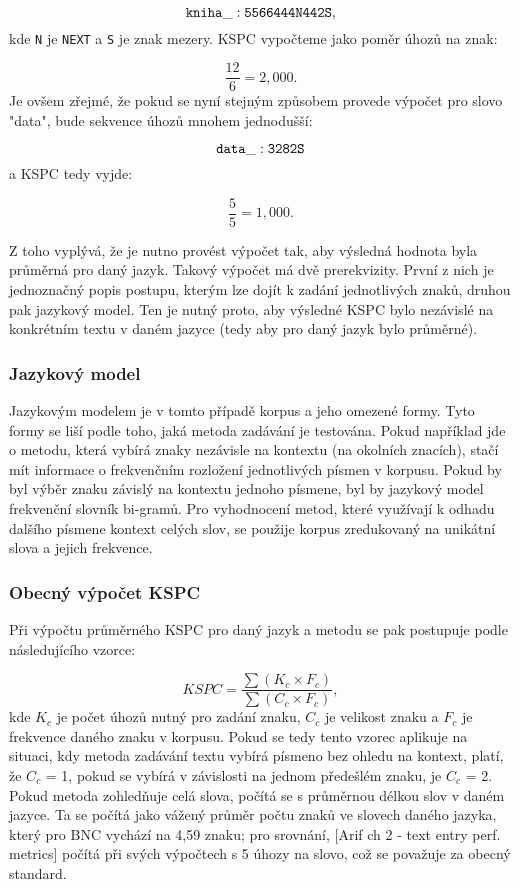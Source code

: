 \documentclass[a4paper,11pt]{article}
\begin{document}
\[
	{\tt kniha\_: 5566444N442S},
\]
kde {\tt N} je {\tt NEXT} a {\tt S} je znak mezery. KSPC vypočteme jako poměr úhozů na znak:

\[
	\frac{12}{6} = 2,000.
\]
Je ovšem zřejmé, že pokud se nyní stejným způsobem provede výpočet pro slovo "data", bude sekvence úhozů mnohem jednodušší:

\[
	{\tt data\_: 3282S}
\]
a KSPC tedy vyjde:

\[
	\frac{5}{5} = 1,000.
\]

Z toho vyplývá, že je nutno provést výpočet tak, aby výsledná hodnota byla průměrná pro daný jazyk. Takový výpočet má dvě prerekvizity. První z nich je jednoznačný popis postupu, kterým lze dojít k zadání jednotlivých znaků, druhou pak jazykový model. Ten je nutný proto, aby výsledné KSPC bylo nezávislé na konkrétním textu v daném jazyce (tedy aby pro daný jazyk bylo průměrné).

\subsubsection{Jazykový model}

Jazykovým modelem je v tomto případě korpus a jeho omezené formy. Tyto formy se liší podle toho, jaká metoda zadávání je testována. Pokud například jde o metodu, která vybírá znaky nezávisle na kontextu (na okolních znacích), stačí mít informace o frekvenčním rozložení jednotlivých písmen v korpusu. Pokud by byl výběr znaku závislý na kontextu jednoho písmene, byl by jazykový model frekvenční slovník bi-gramů. Pro vyhodnocení metod, které využívají k odhadu dalšího písmene kontext celých slov, se použije korpus zredukovaný na unikátní slova a jejich frekvence. %

\subsubsection{Obecný výpočet KSPC}

Při výpočtu průměrného KSPC pro daný jazyk a metodu se pak postupuje podle následujícího vzorce:

\[
	KSPC = \frac{\sum{ (K_c \times F_c) }}{\sum{ (C_c \times F_c) }},
\]
kde $K_c$ je počet úhozů nutný pro zadání znaku, $C_c$ je velikost znaku a $F_c$ je frekvence daného znaku v korpusu. Pokud se tedy tento vzorec aplikuje na situaci, kdy metoda zadávání textu vybírá písmeno bez ohledu na kontext, platí, že $C_c$ = 1, pokud se vybírá v závislosti na jednom předešlém znaku, je $C_c$ = 2. Pokud metoda zohledňuje celá slova, počítá se s průměrnou délkou slov v daném jazyce. Ta se počítá jako vážený průměr počtu znaků ve slovech daného jazyka, který pro BNC vychází na 4,59 znaku; pro srovnání, [Arif ch 2 - text entry perf. metrics] počítá při svých výpočtech s 5 úhozy na slovo, což se považuje za obecný standard. %
\end{document}
